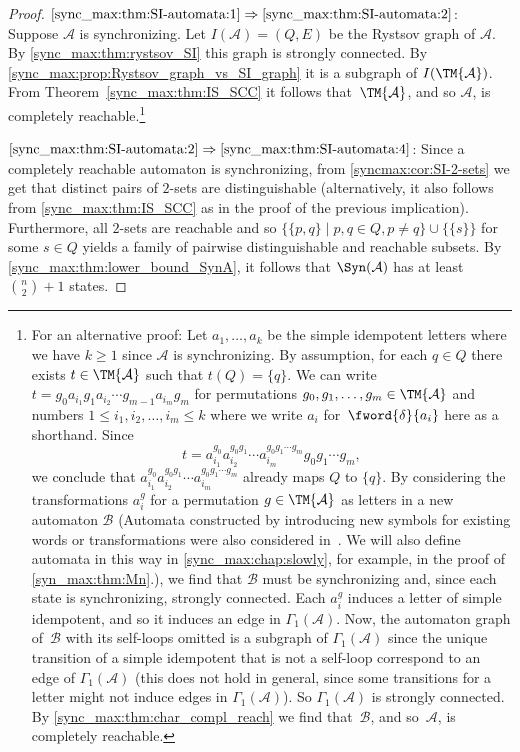 \begin{proof}
	$\ref{sync_max:thm:SI-automata:1} \Rightarrow \ref{sync_max:thm:SI-automata:2}$:
	Suppose $\mathcal A$ is synchronizing. 
	Let $I(\mathcal A) = (Q, E)$ be the Rystsov graph of $\mathcal A$. 
	By \cref{sync_max:thm:rystsov_SI}
	this graph is strongly connected.
	By \cref{sync_max:prop:Rystsov_graph_vs_SI_graph}
	it is a subgraph of $I(\TM{\mathcal A})$.
	From Theorem~\ref{sync_max:thm:IS_SCC}
	it follows that~$\TM{\mathcal A}$, and so $\mathcal A$,
	is completely reachable.\footnote{For an alternative proof:
			Let $a_1, \ldots, a_k$ be the simple idempotent letters where we have $k \ge 1$ since $\mathcal A$ is synchronizing.
			By assumption, for each $q \in Q$
			there exists $t \in \TM{\mathcal A}$
			such that $t(Q) = \{q\}$.
			We can write $t = g_0 a_{i_1} g_1 a_{i_2} \cdots g_{m-1} a_{i_m} g_m$
			for permutations $g_0, g_1, \ldots, g_m \in \TM{\mathcal A}$
			and numbers $1 \le i_1, i_2, \ldots, i_m \le k$
			where we write $a_i$ for~$\fword{\delta}{a_i}$ here as a shorthand.
			Since 
			\[
			t = a_{i_1}^{g_0} a_{i_2}^{g_0 g_1} \cdots  a_{i_m}^{g_0 g_1 \cdots g_m} g_0 g_1 \cdots g_m,
			\]
			we conclude that $a_{i_1}^{g_0} a_{i_2}^{g_0 g_1} \cdots  a_{i_m}^{g_0 g_1 \cdots g_m}$
			already maps $Q$ to $\{q\}$.
			By considering the transformations $a_i^g$ for a permutation $g \in \TM{\mathcal A}$
			as letters in a new automaton $\mathcal B$ (Automata constructed
					by introducing new symbols for existing words or transformations were also considered in~\cite[p.~270]{AnaVolGus2013}.
					We will also define automata in this way in \cref{sync_max:chap:slowly}, for example, in the proof of \cref{syn_max:thm:Mn}.), we find 
			that $\mathcal B$ must be synchronizing and, since each state is synchronizing,
			strongly connected.
			Each $a_i^g$ induces a letter of simple idempotent,
			and so it induces an edge in $\Gamma_1(\mathcal A)$.
			Now, the automaton graph of~$\mathcal B$
			with its self-loops omitted is a subgraph of $\Gamma_1(\mathcal A)$
			since the unique transition of a simple idempotent that is not a self-loop
			correspond to an edge of $\Gamma_1(\mathcal A)$ (this does not hold in general, since some transitions for a letter might not induce edges in $\Gamma_1(\mathcal A)$).
			So $\Gamma_1(\mathcal A)$ is strongly connected.
			By \cref{sync_max:thm:char_compl_reach}
			we find that~$\mathcal B$, and so~$\mathcal A$,
			is completely reachable.
	}
	
	$\ref{sync_max:thm:SI-automata:2} \Rightarrow \ref{sync_max:thm:SI-automata:4}$:
	Since a completely reachable automaton is synchronizing, from \cref{syncmax:cor:SI-2-sets}
	we get that distinct pairs of $2$-sets are distinguishable
	(alternatively, it also follows 
	from \cref{sync_max:thm:IS_SCC}
	as in the proof of the previous implication).
	Furthermore, all $2$-sets are reachable
	and so $\{ \{p,q\} \mid p,q \in Q, p \ne q \} \cup \{\{s\}\}$ for some $s \in Q$
	yields a family of pairwise distinguishable
	and reachable subsets. By \cref{sync_max:thm:lower_bound_SynA}, 
	it follows that $\Syn(\mathcal A)$
	has at least $\binom{n}{2} + 1$ states.
	

\end{proof}
